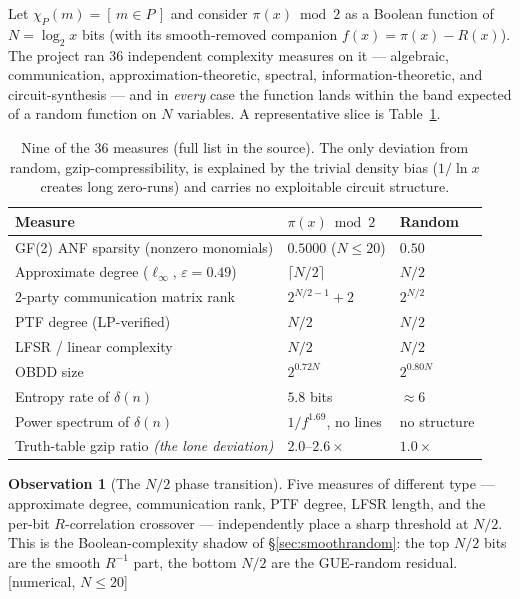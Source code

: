 \documentclass[11pt]{article}
\theoremstyle{plain}
\theoremstyle{definition}
\newtheorem{observation}[theorem]{Observation}
\theoremstyle{remark}
\newcommand{\stat}[1]{\quad\textnormal{\footnotesize\textsf{[\textcolor{accent}{#1}]}}}
\newcommand{\eps}{\varepsilon}
\newcommand{\Rinv}{R^{-1}}
\newcommand{\chiP}{\chi_{P}}
\begin{document}
Let $\chiP(m)=[\,m\in P\,]$ and consider $\pi(x)\bmod 2$ as a Boolean function of
$N=\log_2 x$ bits (with its smooth-removed companion $f(x)=\pi(x)-R(x)$). The
project ran $36$ independent complexity measures on it --- algebraic, communication,
approximation-theoretic, spectral, information-theoretic, and circuit-synthesis ---
and in \emph{every} case the function lands within the band expected of a random
function on $N$ variables. A representative slice is Table~\ref{tab:pseudo}.

\begin{table}[t]
\centering
\footnotesize
\begin{tabular}{@{}p{6.6cm} l l@{}}
\toprule
\textbf{Measure} & \textbf{$\pi(x)\bmod 2$} & \textbf{Random}\\
\midrule
GF(2) ANF sparsity (nonzero monomials) & $0.5000$ ($N\le20$) & $0.50$ \\
Approximate degree ($\ell_\infty$, $\eps{=}0.49$) & $\lceil N/2\rceil$ & $N/2$ \\
$2$-party communication matrix rank & $2^{N/2-1}{+}2$ & $2^{N/2}$ \\
PTF degree (LP-verified) & $N/2$ & $N/2$ \\
LFSR / linear complexity & $N/2$ & $N/2$ \\
OBDD size & $2^{0.72N}$ & $2^{0.80N}$ \\
Entropy rate of $\delta(n)$ & $5.8$ bits & ${\approx}6$ \\
Power spectrum of $\delta(n)$ & $1/f^{1.69}$, no lines & no structure \\
Truth-table gzip ratio \emph{(the lone deviation)} & $2.0$--$2.6\times$ & $1.0\times$ \\
\bottomrule
\end{tabular}
\caption{Nine of the $36$ measures (full list in the source). The only deviation
from random, gzip-compressibility, is explained by the trivial density bias
($1/\ln x$ creates long zero-runs) and carries no exploitable circuit structure.}
\label{tab:pseudo}
\end{table}

\begin{observation}[The $N/2$ phase transition]
\label{obs:n2}
Five measures of different type --- approximate degree, communication rank, PTF
degree, LFSR length, and the per-bit $R$-correlation crossover --- independently
place a sharp threshold at $N/2$. This is the Boolean-complexity shadow of
\S\ref{sec:smoothrandom}: the top $N/2$ bits are the smooth $\Rinv$ part, the
bottom $N/2$ are the GUE-random residual.
\stat{numerical, $N\le 20$}
\end{observation}
\end{document}
